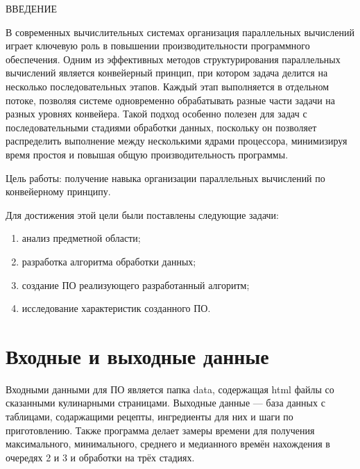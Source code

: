 \begin{center}
    \MakeUppercase{Введение}
\end{center}

В современных вычислительных системах организация параллельных вычислений играет ключевую роль в повышении производительности программного обеспечения. Одним из эффективных методов структурирования параллельных вычислений является конвейерный принцип, при котором задача делится на несколько последовательных этапов. Каждый этап выполняется в отдельном потоке, позволяя системе одновременно обрабатывать разные части задачи на разных уровнях конвейера. Такой подход особенно полезен для задач с последовательными стадиями обработки данных, поскольку он позволяет распределить выполнение между несколькими ядрами процессора, минимизируя время простоя и повышая общую производительность программы.
\vspace{0.25cm}

Цель работы: получение навыка организации параллельных вычислений по конвейерному принципу.

\vspace{0.25cm}
Для достижения этой цели были поставлены следующие задачи:

\begin{enumerate}

\item анализ предметной области;
\item разработка алгоритма обработки данных;
\item создание ПО реализующего разработанный алгоритм;
\item исследование характеристик созданного ПО.

\end{enumerate}

\section{Входные и выходные данные}

\hspace{1.25cm}
Входными данными для ПО является папка data, содержащая html файлы со сказанными кулинарными страницами. Выходные данные --- база данных с таблицами, содаржащими рецепты, ингредиенты для них и шаги по приготовлению. Также программа делает замеры времени для получения максимального, минимального, среднего и медианного времён нахождения в очередях 2 и 3 и обработки на трёх стадиях.

